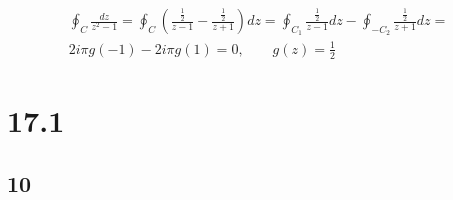 \begin{gather*}
	\oint_C{\frac{dz}{z^2 - 1}} = \oint_C{\left(\frac{\frac{1}{2}}{z - 1} - \frac{\frac{1}{2}}{z + 1}\right) dz}
	=
	\oint_{C_1}{\frac{\frac{1}{2}}{z - 1} dz} - \oint_{-C_2}{\frac{\frac{1}{2}}{z + 1} dz}
	=
	\\
	2 i \pi g(-1) - 2 i \pi g(1) = 0, \qquad g(z) = \frac{1}{2}
\end{gather*}


\section*{17.1}


\subsection*{10}




